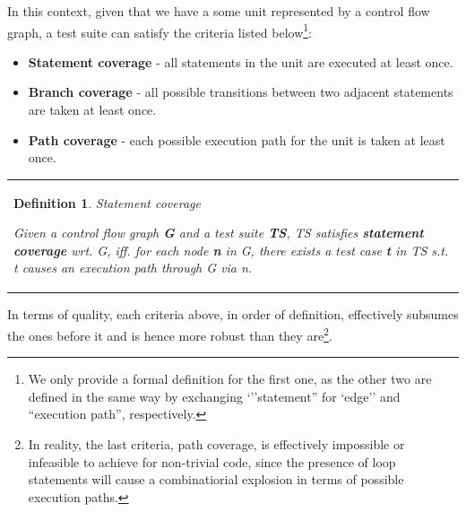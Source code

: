 \documentclass{article}
\newcommand{\tmem}[1]{{\em #1\/}}
\newcommand{\tmstrong}[1]{\textbf{#1}}
\newenvironment{itemizedot}{\begin{itemize} \renewcommand{\labelitemi}{$\bullet$}\renewcommand{\labelitemii}{$\bullet$}\renewcommand{\labelitemiii}{$\bullet$}\renewcommand{\labelitemiv}{$\bullet$}}{\end{itemize}}
\newenvironment{tmparmod}[3]{\begin{list}{}{\setlength{\topsep}{0pt}\setlength{\leftmargin}{#1}\setlength{\rightmargin}{#2}\setlength{\parindent}{#3}\setlength{\listparindent}{\parindent}\setlength{\itemindent}{\parindent}\setlength{\parsep}{\parskip}} \item[]}{\end{list}}
\newtheorem{definition}{Definition}
{\theorembodyfont{\rmfamily}\newtheorem{example}{Example}}
\begin{document}
In this context, given that we have a some unit represented by a control flow
graph, a test suite can satisfy the criteria listed below{\footnote{We only
provide a formal definition for the first one, as the other two are defined in
the same way by exchanging `''statement'' for `edge'' and ``execution path'',
respectively.}}:
\begin{itemizedot}
  \item {\tmstrong{Statement coverage}} - all statements in the unit are
  executed at least once.
  
  \item {\tmstrong{Branch coverage}} - all possible transitions between two
  adjacent statements are taken at least once.
  
  \item {\tmstrong{Path coverage}} - each possible execution path for the unit
  is taken at least once.
\end{itemizedot}


\begin{tmparmod}{1cm}{0pt}{0pt}
  \begin{tmparmod}{0pt}{1cm}{0pt}
    {\noindent}{\noindent}\begin{tabular}{l}
      \begin{definition}
        Statement coverage
        
        
        
        Given a control flow graph {\tmem{{\tmstrong{G{\tmstrong{}}}}}} and a
        test suite {\tmem{{\tmstrong{TS}}{\tmstrong{}}}}, TS satisfies
        {\tmstrong{statement coverage}} wrt. G, iff. for each node
        {\tmstrong{{\tmem{n}}}} in G, there exists a test case {\tmstrong{t}}
        in TS s.t. t causes an execution path through G via n. 
      \end{definition}
    \end{tabular}{\hspace*{\fill}}{\smallskip}
  \end{tmparmod}
\end{tmparmod}

\begin{tmparmod}{1cm}{0pt}{0pt}
  \begin{tmparmod}{0pt}{1cm}{0pt}
    
  \end{tmparmod}
\end{tmparmod}



In terms of quality, each criteria above, in order of definition, effectively
subsumes the ones before it and is hence more robust than they
are{\footnote{In reality, the last criteria, path coverage, is effectively
impossible or infeasible to achieve for non-trivial code, since the presence
of loop statements will cause a combinatiorial explosion in terms of possible
execution paths. }}.
\end{document}
